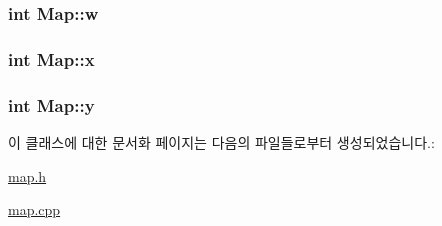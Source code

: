\hypertarget{class_map_a5b2c9fabbf1ef526d4d75c7dd87ab026}{
\subsubsection[{w}]{\setlength{\rightskip}{0pt plus 5cm}int {\bf \-Map\-::w}}}\label{class_map_a5b2c9fabbf1ef526d4d75c7dd87ab026}
\hypertarget{class_map_a6b8ab15ba5a4d4b50e17ce50e83a66cb}{
\subsubsection[{x}]{\setlength{\rightskip}{0pt plus 5cm}int {\bf \-Map\-::x}}}\label{class_map_a6b8ab15ba5a4d4b50e17ce50e83a66cb}
\hypertarget{class_map_a94da184f644e9b8a3e7f2ba107255531}{
\subsubsection[{y}]{\setlength{\rightskip}{0pt plus 5cm}int {\bf \-Map\-::y}}}\label{class_map_a94da184f644e9b8a3e7f2ba107255531}


이 클래스에 대한 문서화 페이지는 다음의 파일들로부터 생성되었습니다.\-:\begin{DoxyCompactItemize}
\item 
\hyperlink{map_8h}{map.\-h}\item 
\hyperlink{map_8cpp}{map.\-cpp}\end{DoxyCompactItemize}
